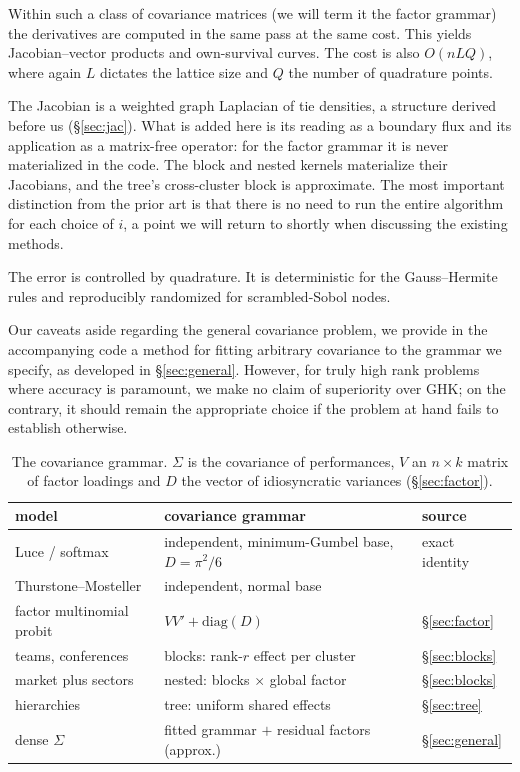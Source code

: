 \documentclass[11pt]{article}
\begin{document}
Within such a class of covariance matrices (we will term it the factor grammar) the derivatives are computed in the same pass at the same cost. This yields Jacobian--vector products and own-survival curves. The cost is also $O(nLQ)$, where again $L$ dictates the lattice size and $Q$ the number of quadrature points.

The Jacobian is a weighted graph Laplacian of tie densities, a structure \citet{muller2022} derived before us (\S\ref{sec:jac}). What is added here is its reading as a boundary flux and its application as a matrix-free operator: for the factor grammar it is never materialized in the code. The block and nested kernels materialize their Jacobians, and the tree's cross-cluster block is approximate. The most important distinction from the prior art is that there is no need to run the entire algorithm for each choice of $i$, a point we will return to shortly when discussing the existing methods.

The error is controlled by quadrature. It is deterministic for the Gauss--Hermite rules and reproducibly randomized for
scrambled-Sobol nodes.

Our caveats aside regarding the general covariance problem, we provide in the accompanying code a method for fitting arbitrary covariance to the grammar we specify, as developed in \S\ref{sec:general}. However, for truly high rank problems where accuracy is paramount, we make no claim of superiority over GHK; on the contrary, it should remain the appropriate choice if the problem at hand fails to establish otherwise.

\begin{table}[h]\centering\footnotesize
\setlength{\tabcolsep}{4pt}
\begin{tabular}{lll}
\toprule
model & covariance grammar & source \\
\midrule
Luce / softmax & independent, minimum-Gumbel base, $D=\pi^2/6$ & exact identity \\
Thurstone--Mosteller \citep{mosteller1951} & independent, normal base & \citet{cotton2021} \\
factor multinomial probit & $VV'+\mathrm{diag}(D)$ & \S\ref{sec:factor} \\
teams, conferences & blocks: rank-$r$ effect per cluster & \S\ref{sec:blocks} \\
market plus sectors & nested: blocks $\times$ global factor & \S\ref{sec:blocks} \\
hierarchies & tree: uniform shared effects & \S\ref{sec:tree} \\
dense $\Sigma$ & fitted grammar $+$ residual factors (approx.) & \S\ref{sec:general} \\
\bottomrule
\end{tabular}
\caption{The covariance grammar. $\Sigma$ is the covariance of performances, $V$ an $n\times k$ matrix of factor loadings and $D$ the vector of idiosyncratic variances (\S\ref{sec:factor}).}\label{tab:grammar}
\end{table}
\end{document}
